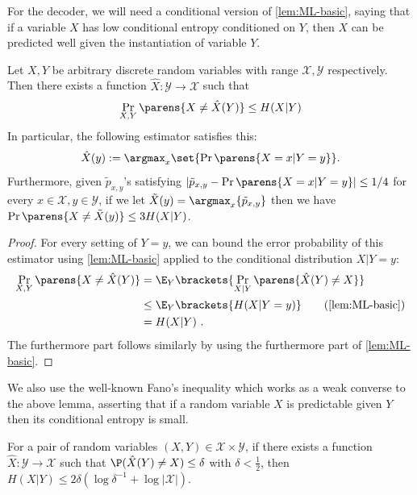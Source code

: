 \documentclass[11pt]{article}
\begin{document}
For the decoder, we will need a conditional version of
\cref{lem:ML-basic}, 
saying that if a variable $X$
has low conditional entropy conditioned on $Y$,
then $X$ can be predicted well given the instantiation of variable $Y$.
\begin{lemma}
	\label{lem:ML-conditional}
	Let $X, Y$ be arbitrary discrete random variables with range $\mathcal{X}, \mathcal{Y}$ respectively.
	Then there exists a function $\hat X: \mathcal{Y}\to \mathcal{X}$ 
	such that
	$$\Pr_{X, Y}\parens{X \neq \hat X(Y)} \leq H(X|Y)$$
	In particular, the following estimator satisfies this:
	$$\hat X(y) := \argmax_x\set{\Pr\parens{X = x | Y = y}}.$$
	Furthermore, given $\tilde{p}_{x,y}$'s satisfying $|\tilde{p}_{x,y} - \Pr\parens{X = x | Y = y}| \leq 1/4$ for every $x \in \mathcal{X}, y \in \mathcal{Y}$, if we let $\tilde{X}(y) = \argmax_x \{\tilde{p}_{x,y} \}$ then we have $\Pr\parens{X \neq \tilde{X}(y)} \leq 3H(X|Y)$.
\end{lemma}
\begin{proof}
	For every setting of $Y = y$, we can bound the error probability
	of this estimator using
	\cref{lem:ML-basic}
	applied to the conditional distribution $X | Y = y$:
	\begin{align*}
		\Pr_{X, Y}\parens{X \neq \hat X(Y)}
		&= \E_{Y}\brackets{\Pr_{X | Y}\parens{\hat X(Y) \neq X}}\\
		&\leq \E_{Y}\brackets{H(X | Y = y)} \tag{\cref{lem:ML-basic}}\\
		&= H(X | Y) \ . \qedhere
	\end{align*}
	The furthermore part follows similarly by using the furthermore part of \cref{lem:ML-basic}.
\end{proof}

We also use the well-known Fano's inequality which works as a weak converse to the above lemma, asserting that if a random variable $X$ is predictable given $Y$ then its conditional entropy is small.

\begin{lemma}
	\label{lem:prediction-gives-entropy}
	For a pair of random variables $(X,Y) \in \mathcal{X}\times \mathcal{Y}$, if there exists a function $\hat X: \mathcal{Y}\to \mathcal{X}$ such that $\P(\hat X(Y) \not= X) \leq \delta$ with $\delta < \frac{1}{2}$, then $H(X | Y) \leq 2 \delta (\log \delta^{-1} + \log |\mathcal{X}|)$.
\end{lemma}
\end{document}
